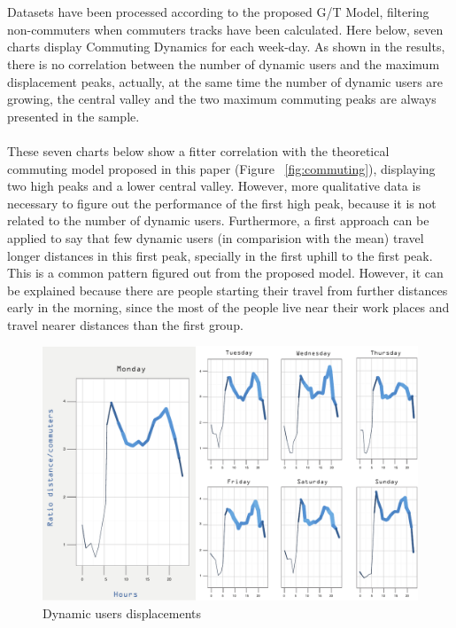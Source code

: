 \\
\\
Datasets have been processed according to the proposed G/T Model, filtering non-commuters when commuters tracks have been calculated. Here below, seven charts display Commuting Dynamics for each week-day.
As shown in the results, there is no correlation between the number of dynamic users and the maximum displacement peaks, actually, at the same time the number of dynamic users are growing, the central valley and the two maximum commuting peaks are always presented in the sample.
\\
\\
These seven charts below show a fitter correlation with the theoretical commuting model proposed in this paper (Figure ~\ref{fig:commuting}), displaying two high peaks and a lower central valley. However, more qualitative data is necessary to figure out the performance of the first high peak, because it is not related to the number of dynamic users. Furthermore, a first approach can be applied to say that few dynamic users (in comparision with the mean) travel longer distances in this first peak, specially in  the first uphill to the first peak. This is a common pattern figured out from the proposed model. However, it can be explained because there are people starting their travel from further distances early in the morning, since the most of the people live near their work places and travel nearer distances than the first group.  


\begin{figure}[h]
\begin{center}
\includegraphics[scale = 0.75] {results/images/commuting_results.pdf}
\caption{Dynamic users displacements}
\label{fig:dynamic_displacements}
\end{center}
\end{figure}


